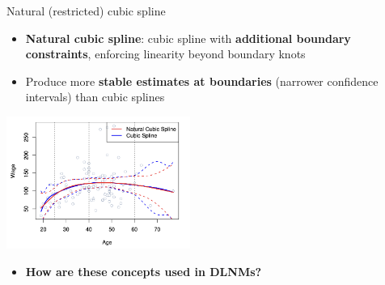 \documentclass[english]{beamer}
\newcommand{\alertblue}[1]{{\color{blue}#1}}
\begin{document}
\begin{frame}{Natural (restricted) cubic spline}
    \begin{itemize}
        \item \alertblue{\textbf{Natural cubic spline}}: cubic spline with \alertblue{\textbf{additional boundary constraints}}, enforcing linearity beyond boundary knots
        \item Produce more \alertblue{\textbf{stable estimates at boundaries}} (narrower confidence intervals) than cubic splines
    \end{itemize}
    \centering
    \includegraphics[width=6cm]{images/cubic_vs_natural.png}
    \begin{itemize}
        \item \alertblue{\textbf{How are these concepts used in DLNMs?}}
    \end{itemize}
\end{frame}
\end{document}
